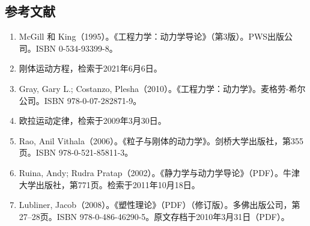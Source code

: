 \subsection{参考文献}  
\begin{enumerate}
\item McGill 和 King（1995）。《工程力学：动力学导论》（第3版）。PWS出版公司。ISBN 0-534-93399-8。  
\item 刚体运动方程，检索于2021年6月6日。  
\item Gray, Gary L.; Costanzo, Plesha（2010）。《工程力学：动力学》。麦格劳-希尔公司。ISBN 978-0-07-282871-9。  
\item 欧拉运动定律，检索于2009年3月30日。  
\item Rao, Anil Vithala（2006）。《粒子与刚体的动力学》。剑桥大学出版社，第355页。ISBN 978-0-521-85811-3。  
\item Ruina, Andy; Rudra Pratap（2002）。《静力学与动力学导论》（PDF）。牛津大学出版社，第771页。检索于2011年10月18日。  
\item Lubliner, Jacob（2008）。《塑性理论》（PDF）（修订版）。多佛出版公司，第27–28页。ISBN 978-0-486-46290-5。原文存档于2010年3月31日（PDF）。
\end{enumerate}